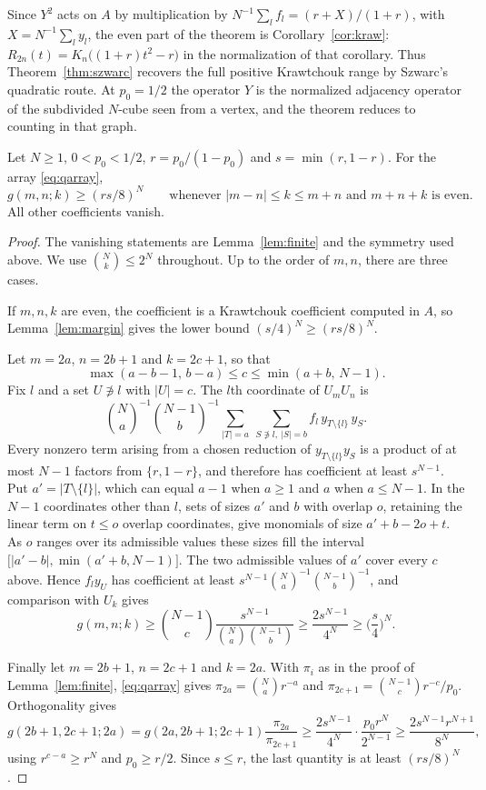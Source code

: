 Since $Y^2$ acts on $A$ by multiplication by $N^{-1}\sum_lf_l=(r+X)/(1+r)$, with $X=N^{-1}\sum_ly_l$, the even part of the theorem is Corollary~\ref{cor:kraw}: $R_{2n}(t)=K_n\big((1+r)t^2-r\big)$ in the normalization of that corollary. Thus Theorem~\ref{thm:szwarc} recovers the full positive Krawtchouk range by Szwarc's quadratic route. At $p_0=1/2$ the operator $Y$ is the normalized adjacency operator of the subdivided $N$-cube seen from a vertex, and the theorem reduces to counting in that graph.

\begin{lemma}\label{lem:qmargin}
Let $N\geq1$, $0<p_0<1/2$, $r=p_0/(1-p_0)$ and $s=\min(r,1-r)$. For the array \eqref{eq:qarray},
\[
g(m,n;k)\geq(rs/8)^N\qquad\text{whenever }|m-n|\leq k\leq m+n\text{ and }m+n+k\text{ is even}.
\]
All other coefficients vanish.
\end{lemma}
\begin{proof}
The vanishing statements are Lemma~\ref{lem:finite} and the symmetry used above. We use $\binom Nk\leq2^N$ throughout. Up to the order of $m,n$, there are three cases.

If $m,n,k$ are even, the coefficient is a Krawtchouk coefficient computed in $A$, so Lemma~\ref{lem:margin} gives the lower bound $(s/4)^N\geq(rs/8)^N$.

Let $m=2a$, $n=2b+1$ and $k=2c+1$, so that
\[
\max(a-b-1,\,b-a)\leq c\leq\min(a+b,\,N-1).
\]
Fix $l$ and a set $U\not\ni l$ with $|U|=c$. The $l$th coordinate of $U_mU_n$ is
\[
\binom Na^{-1}\binom{N-1}b^{-1}\sum_{|T|=a}\ \sum_{S\not\ni l,\ |S|=b}f_l\,y_{T\setminus\{l\}}\,y_S .
\] Every nonzero term arising from a chosen reduction of $y_{T\setminus\{l\}}y_S$ is a product of at most $N-1$ factors from $\{r,1-r\}$, and therefore has coefficient at least $s^{N-1}$. Put $a'=|T\setminus\{l\}|$, which can equal $a-1$ when $a\geq1$ and $a$ when $a\leq N-1$. In the $N-1$ coordinates other than $l$, sets of sizes $a'$ and $b$ with overlap $o$, retaining the linear term on $t\leq o$ overlap coordinates, give monomials of size $a'+b-2o+t$. As $o$ ranges over its admissible values these sizes fill the interval $\big[|a'-b|,\min(a'+b,N-1)\big]$. The two admissible values of $a'$ cover every $c$ above. Hence $f_ly_U$ has coefficient at least $s^{N-1}\binom Na^{-1}\binom{N-1}b^{-1}$, and comparison with $U_k$ gives
\[
g(m,n;k)\geq\binom{N-1}c\frac{s^{N-1}}{\binom Na\binom{N-1}b}\geq\frac{2s^{N-1}}{4^N}\geq\Big(\frac s4\Big)^N.
\]

Finally let $m=2b+1$, $n=2c+1$ and $k=2a$. With $\pi_i$ as in the proof of Lemma~\ref{lem:finite}, \eqref{eq:qarray} gives $\pi_{2a}=\binom Nar^{-a}$ and $\pi_{2c+1}=\binom{N-1}cr^{-c}/p_0$. Orthogonality gives
\[
g(2b+1,2c+1;2a)=g(2a,2b+1;2c+1)\frac{\pi_{2a}}{\pi_{2c+1}}
\geq\frac{2s^{N-1}}{4^N}\cdot\frac{p_0r^N}{2^{N-1}}
\geq\frac{2s^{N-1}r^{N+1}}{8^N},
\]
using $r^{c-a}\geq r^N$ and $p_0\geq r/2$. Since $s\leq r$, the last quantity is at least $(rs/8)^N$.
\end{proof}

